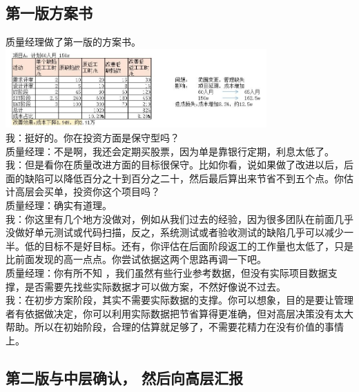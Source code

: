 \hypertarget{ux7b2cux4e00ux7248ux65b9ux6848ux4e66}{%
\subsection{第一版方案书}\label{ux7b2cux4e00ux7248ux65b9ux6848ux4e66}}

质量经理做了第一版的方案书。\\

\includegraphics[width=10cm]{方案书1.jpg}\\

我：挺好的。你在投资方面是保守型吗？\\
质量经理：不是啊，我还会定期买股票，因为单是靠银行定期，利息太低了。\\
我：但是看你在质量改进方面的目标很保守。比如你看，说如果做了改进以后，后面的缺陷可以降低百分之十到百分之二十，然后最后算出来节省不到五个点。你估计高层会买单，投资你这个项目吗？\\
质量经理：确实有道理。\\
我：你这里有几个地方没做对，例如从我们过去的经验，因为很多团队在前面几乎没做好单元测试或代码扫描，反之，系统测试或者验收测试的缺陷几乎可以减少一半。低的目标不是好目标。还有，你评估在后面阶段返工的工作量也太低了，只是比前面发现的高一点点。你尝试依据这两个思路再调一下吧。\\
质量经理：你有所不知
，我们虽然有些行业参考数据，但没有实际项目数据支撑，是否需要先找些实际数据才可以做方案，不然好像说不过去。\\
我：在初步方案阶段，其实不需要实际数据的支撑。你可以想象，目的是要让管理者有依据做决定，你可以利用实际数据把节省算得更准确，但对高层决策没有太大帮助。所以在初始阶段，合理的估算就足够了，不需要花精力在没有价值的事情上。\\

\hypertarget{ux7b2cux4e8cux7248ux4e0eux4e2dux5c42ux786eux8ba4-ux7136ux540eux5411ux9ad8ux5c42ux6c47ux62a5}{%
\subsection{第二版与中层确认，
然后向高层汇报}\label{ux7b2cux4e8cux7248ux4e0eux4e2dux5c42ux786eux8ba4-ux7136ux540eux5411ux9ad8ux5c42ux6c47ux62a5}}

